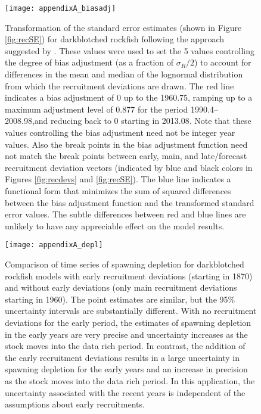 \begin{figure}[H]
	\begin{center}
	\texttt{[image: appendixA\_biasadj]}\\
	\end{center}
	\caption{ Transformation of the standard error estimates (shown in Figure \ref{fig:recSE}) for darkblotched rockfish following the approach suggested by \citet{methot-adjusting-2011}. These values were used to set the 5 values controlling the degree of bias adjustment (as a fraction of  $\sigma_R/2$) to account for differences in the mean and median of the lognormal distribution from which the recruitment deviations are drawn. The red line indicates a bias adjustment of 0 up to the  1960.75, ramping up to a maximum adjustment level of 0.877 for the period 1990.4--2008.98,and reducing back to 0 starting in 2013.08. Note that these values controlling the bias adjustment need not be integer year values. Also the break points in the bias adjustment function need not match the break points between early, main, and late/forecast recruitment deviation vectors (indicated by blue and black colors in Figures \ref{fig:recdevs} and \ref{fig:recSE}). The blue line indicates a functional form that minimizes the sum of squared differences between the bias adjustment function and the transformed standard error values. The subtle differences between red and blue lines are unlikely to have any appreciable effect on the model results.}
	\label{fig:ramp}
\end{figure}


\begin{figure}[H]
	\begin{center}
	\texttt{[image: appendixA\_depl]}\\
	\end{center}
	\caption{ Comparison of time series of spawning depletion for darkblotched rockfish models with early recruitment deviations (starting in 1870) and without early deviations (only main recruitment deviations starting in 1960). The point estimates are similar, but the 95\% uncertainty intervals are substantially different. With no recruitment deviations for the early period, the estimates of spawning depletion in the early years are very precise and uncertainty increases as the stock moves into the data rich period. In contrast, the addition of the early recruitment deviations results in a large uncertainty in spawning depletion for the early years and an increase in precision as the stock moves into the data rich period. In this application, the uncertainty associated with the recent years is independent of the assumptions about early recruitments.}
\end{figure}

